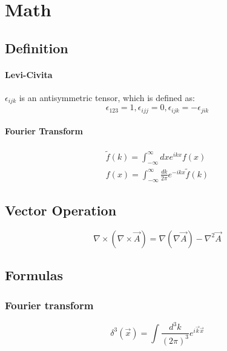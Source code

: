\chapter{Math}

\section{Definition}

\subsubsection{Levi-Civita}
$\epsilon_{ijk}$ is an antisymmetric tensor, which is defined as: 
\begin{equation}
    \label{eqn:math::Levi-Civita}
    \epsilon_{123} = 1, \epsilon_{ijj} = 0, \epsilon_{ijk} = -\epsilon_{jik}
\end{equation}

\subsubsection{Fourier Transform}
\begin{equation}
    \label{eqn:math::FT}
    \begin{gathered}
    \tilde{f}(k) = \int_{-\infty}^{\infty}dx e^{ikx}f(x)	\\
    f(x) = \int_{-\infty}^{\infty}\frac{dk}{2\pi}e^{-ikx}\tilde{f}(k)
    \end{gathered}
\end{equation}

\section{Vector Operation}
\begin{equation}
    \nabla\times(\nabla\times\vec{A}) = \nabla(\nabla\vec{A}) - \nabla^2\vec{A} 
\end{equation}

\section{Formulas}

\subsection{Fourier transform}
\[
    \delta^3(\vec{x})=\int\frac{d^3k}{(2\pi)^3}e^{i\vec{k}\vec{x}}
    \]
